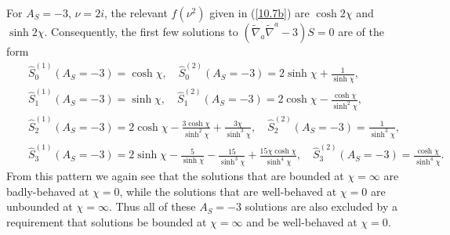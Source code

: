 \documentclass[aps,onecolumn,10pt]{revtex4}
\numberwithin{equation}{section}
\numberwithin{equation}{section}
\begin{document}
For $A_S=-3$, $\nu=2i$, the relevant $f(\nu^2)$ given in (\ref{10.7b}) are $\cosh 2\chi$ and $\sinh 2\chi$. Consequently, the first few solutions  to $(\tilde{\nabla}_a\tilde{\nabla}^a-3)S=0$ are of the form
%
\begin{eqnarray}
&&\hat{S}^{(1)}_0(A_S=-3)=\cosh\chi,\quad \hat{S}^{(2)}_0(A_S=-3)=2\sinh\chi+\frac{1}{\sinh\chi},
\nonumber\\
&&\hat{S}^{(1)}_1(A_S=-3)=\sinh\chi,\quad \hat{S}^{(2)}_1(A_S=-3)=2\cosh\chi-\frac{\cosh\chi}{\sinh^2\chi},
\nonumber\\
&&\hat{S}^{(1)}_2(A_S=-3)=2\cosh\chi-\frac{3\cosh\chi}{\sinh^2\chi}+\frac{3\chi}{\sinh^3\chi},\quad \hat{S}^{(2)}_2(A_S=-3)=\frac{1}{\sinh^3\chi},
\nonumber\\
&&\hat{S}^{(1)}_3(A_S=-3)=2\sinh\chi-\frac{5}{\sinh\chi}-\frac{15}{\sinh^3\chi}+\frac{15\chi\cosh\chi}{\sinh^4\chi},\quad \hat{S}^{(2)}_3(A_S=-3)=\frac{\cosh\chi}{\sinh^4\chi}.
\label{10.12b}
\end{eqnarray}
%
From this pattern we again see that the solutions that are bounded at $\chi=\infty$ are badly-behaved at $\chi=0$, while the solutions that are  well-behaved at $\chi=0$ are unbounded at $\chi=\infty$. Thus all of these $A_S=-3$ solutions are also excluded by a requirement that solutions be  bounded at $\chi=\infty$ and be well-behaved at $\chi=0$.
\end{document}
